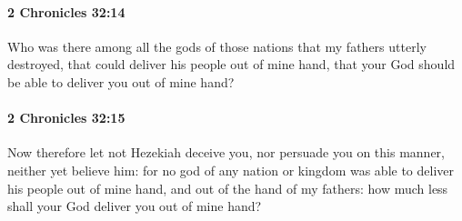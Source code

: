 		\paragraph{2 Chronicles 32:14} %
			\label{2CHRONICLES-32-14}

			Who was there among all the gods of those nations that my fathers utterly destroyed, that could deliver his people out of mine hand, that your God should be able to deliver you out of mine hand?


		\paragraph{2 Chronicles 32:15} %
			\label{2CHRONICLES-32-15}

			Now therefore let not Hezekiah deceive you, nor persuade you on this manner, neither yet believe him: for no god of any nation or kingdom was able to deliver his people out of mine hand, and out of the hand of my fathers: how much less shall your God deliver you out of mine hand?

